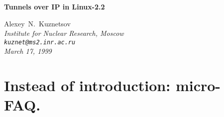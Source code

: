 \def\TITLE{Tunnels over IP}

\begin{center}
\Large\bf Tunnels over IP in Linux-2.2
\end{center}


\begin{center}
{ \large Alexey~N.~Kuznetsov } \\
\em Institute for Nuclear Research, Moscow \\
\verb|kuznet@ms2.inr.ac.ru| \\
\rm March 17, 1999
\end{center}

\vspace{5mm}

\tableofcontents


\section{Instead of introduction: micro-FAQ.}


